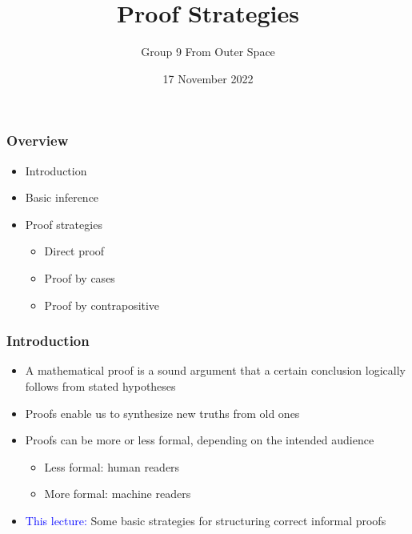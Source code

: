 \documentclass{beamer}
\title{Proof Strategies}
\author{Group 9 From Outer Space}
\date{17 November 2022}
\begin{document}
\begin{frame}
  \titlepage
\end{frame}

\begin{frame}
  \frametitle{Overview}
  \begin{itemize}
  \item Introduction\\
  \item Basic inference\\
  \item Proof strategies
    \begin{itemize}
    \item Direct proof
    \item Proof by cases
    \item Proof by contrapositive\\
    \end{itemize}
  \end{itemize}
\end{frame}

\begin{frame}
  \frametitle{Introduction}
  \begin{itemize}
  \item A mathematical proof is a sound argument that a certain
    conclusion logically follows from stated hypotheses\\
  \item Proofs enable us to synthesize new truths from old ones\\
  \item Proofs can be more or less formal, depending on the intended
    audience
    \begin{itemize}
    \item Less formal: human readers
    \item More formal: machine readers\\
    \end{itemize}
  \item \textcolor{blue}{This lecture:} Some basic strategies for
    structuring correct informal proofs
  \end{itemize}
\end{frame}





\end{document}
